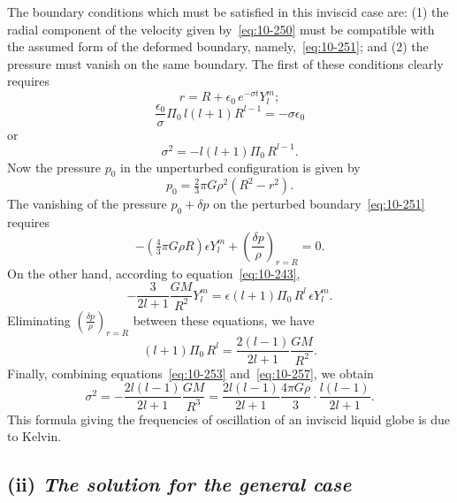 The boundary conditions which must be satisfied in this inviscid case are: (1) the radial component of the velocity given by~\eqref{eq:10-250} must be compatible with the assumed form of the deformed boundary, namely,~\eqref{eq:10-251}; and (2) the pressure must vanish on the same boundary. The first of these conditions clearly requires
\begin{equation}
\label{eq:10-251}
r = R + \epsilon_0\,e^{-\sigma t}Y_l^m;
\end{equation}
\begin{equation}
\label{eq:10-252}
\frac{\epsilon_0}{\sigma}\Pi_0\,l(l+1)R^{l-1} = -\sigma\epsilon_0
\end{equation}
or
\begin{equation}
\label{eq:10-253}
\sigma^2 = -l(l+1)\Pi_0\,R^{l-1}.
\end{equation}
Now the pressure $p_0$ in the unperturbed configuration is given by
\begin{equation}
\label{eq:10-254}
p_0 = \tfrac{2}{3}\pi G\rho^2(R^2-r^2).
\end{equation}
The vanishing of the pressure $p_0+\delta p$ on the perturbed boundary~\eqref{eq:10-251} requires
\begin{equation}
\label{eq:10-255}
-(\tfrac{4}{3}\pi G\rho R)\epsilon Y_l^m + \left(\frac{\delta p}{\rho}\right)_{r=R} = 0.
\end{equation}
On the other hand, according to equation~\eqref{eq:10-243},
\begin{equation}
\label{eq:10-256}
-\frac{3}{2l+1}\frac{GM}{R^2}Y_l^m = \epsilon(l+1)\Pi_0\,R^{l}\,\epsilon Y_l^m.
\end{equation}
Eliminating $\left(\frac{\delta p}{\rho}\right)_{r=R}$ between these equations, we have
\begin{equation}
\label{eq:10-257}
(l+1)\Pi_0\,R^l = \frac{2(l-1)}{2l+1}\frac{GM}{R^2}.
\end{equation}
Finally, combining equations~\eqref{eq:10-253} and~\eqref{eq:10-257}, we obtain
\begin{equation}
\label{eq:10-258}
\sigma^2 = -\frac{2l(l-1)}{2l+1}\frac{GM}{R^3} = \frac{2l(l-1)}{2l+1}\frac{4\pi G\rho}{3}\cdot\frac{l(l-1)}{2l+1}.
\end{equation}
This formula giving the frequencies of oscillation of an inviscid liquid globe is due to Kelvin.

\subsection*{(ii) \textit{The solution for the general case}}

